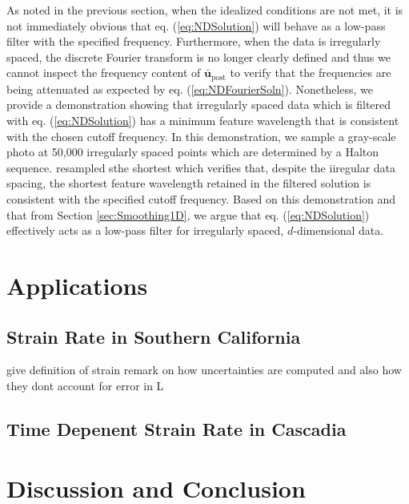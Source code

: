 \documentclass[10pt,a4paper]{article}
\begin{document}
As noted in the previous section, when the idealized conditions are not met, it is not immediately obvious that eq. (\ref{eq:NDSolution}) will behave as a low-pass filter with the specified frequency. Furthermore, when the data is irregularly spaced, the discrete Fourier transform is no longer clearly defined and thus we cannot inspect the frequency content of $\mathbf{\bar{u}}_\mathrm{post}$ to verify that the frequencies are being attenuated as expected by eq. (\ref{eq:NDFourierSoln}). Nonetheless, we provide a demonstration showing that irregularly spaced data which is filtered with eq. (\ref{eq:NDSolution}) has a minimum feature wavelength that is consistent with the chosen cutoff frequency.  In this demonstration, we sample a gray-scale photo at 50,000 irregularly spaced points which are determined by a Halton sequence. resampled sthe shortest  which verifies that, despite the iiregular data spacing, the shortest feature wavelength retained in the filtered solution is consistent with the specified cutoff frequency.  Based on this demonstration and that from Section \ref{sec:Smoothing1D}, we argue that eq. (\ref{eq:NDSolution}) effectively acts as a low-pass filter for irregularly spaced, $d$-dimensional data.



\section{Applications}\label{sec:Applications}

\subsection{Strain Rate in Southern California}\label{sec:ApplicationsSoCal}
give definition of strain
remark on how uncertainties are computed and also how they dont account for error in L

\subsection{Time Depenent Strain Rate in Cascadia}\label{sec:ApplicationsCascadia}

\section{Discussion and Conclusion}\label{sec:Discussion}




  
 
\end{document}
